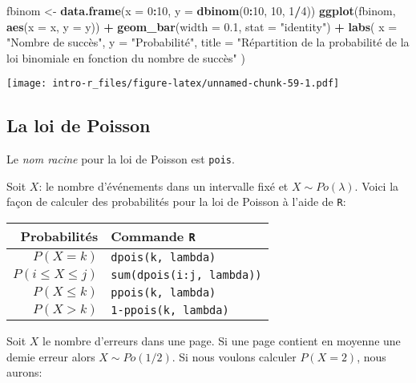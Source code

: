 \documentclass[]{book}
\newenvironment{Shaded}{\begin{snugshade}}{\end{snugshade}}
\newcommand{\KeywordTok}[1]{\textcolor[rgb]{0.13,0.29,0.53}{\textbf{#1}}}
\newcommand{\DataTypeTok}[1]{\textcolor[rgb]{0.13,0.29,0.53}{#1}}
\newcommand{\DecValTok}[1]{\textcolor[rgb]{0.00,0.00,0.81}{#1}}
\newcommand{\FloatTok}[1]{\textcolor[rgb]{0.00,0.00,0.81}{#1}}
\newcommand{\StringTok}[1]{\textcolor[rgb]{0.31,0.60,0.02}{#1}}
\newcommand{\OperatorTok}[1]{\textcolor[rgb]{0.81,0.36,0.00}{\textbf{#1}}}
\newcommand{\NormalTok}[1]{#1}
\begin{document}
\begin{Shaded}
\begin{Highlighting}[]
\NormalTok{fbinom <-}\StringTok{ }\KeywordTok{data.frame}\NormalTok{(}\DataTypeTok{x =} \DecValTok{0}\OperatorTok{:}\DecValTok{10}\NormalTok{, }\DataTypeTok{y =} \KeywordTok{dbinom}\NormalTok{(}\DecValTok{0}\OperatorTok{:}\DecValTok{10}\NormalTok{, }\DecValTok{10}\NormalTok{, }\DecValTok{1}\OperatorTok{/}\DecValTok{4}\NormalTok{))}
\KeywordTok{ggplot}\NormalTok{(fbinom, }\KeywordTok{aes}\NormalTok{(}\DataTypeTok{x =}\NormalTok{ x, }\DataTypeTok{y =}\NormalTok{ y)) }\OperatorTok{+}
\StringTok{  }\KeywordTok{geom_bar}\NormalTok{(}\DataTypeTok{width =} \FloatTok{0.1}\NormalTok{, }\DataTypeTok{stat =} \StringTok{"identity"}\NormalTok{) }\OperatorTok{+}
\StringTok{  }\KeywordTok{labs}\NormalTok{(}
    \DataTypeTok{x =} \StringTok{"Nombre de succès"}\NormalTok{,}
    \DataTypeTok{y =} \StringTok{"Probabilité"}\NormalTok{,}
    \DataTypeTok{title =} \StringTok{"Répartition de la probabilité de la loi binomiale en fonction du nombre de succès"}
\NormalTok{  )}
\end{Highlighting}
\end{Shaded}

\texttt{[image: intro-r\_files/figure-latex/unnamed-chunk-59-1.pdf]}

\subsection{La loi de Poisson}\label{la-loi-de-poisson}

Le \emph{nom racine} pour la loi de Poisson est \texttt{pois}.

Soit \(X\): le nombre d'événements dans un intervalle fixé et
\(X\sim Po(\lambda)\). Voici la façon de calculer des probabilités pour
la loi de Poisson à l'aide de \texttt{R}:

\begin{longtable}[]{@{}rl@{}}
\toprule
Probabilités & Commande \texttt{R}\tabularnewline
\midrule
\endhead
\(P(X=k)\) & \texttt{dpois(k,\ lambda)}\tabularnewline
\(P(i\leq X \leq j)\) & \texttt{sum(dpois(i:j,\ lambda))}\tabularnewline
\(P(X\leq k)\) & \texttt{ppois(k,\ lambda)}\tabularnewline
\(P(X>k)\) & \texttt{1-ppois(k,\ lambda)}\tabularnewline
\bottomrule
\end{longtable}

Soit \(X\) le nombre d'erreurs dans une page. Si une page contient en
moyenne une demie erreur alors \(X\sim Po(1/2)\). Si nous voulons
calculer \(P(X=2)\), nous aurons:
\end{document}
